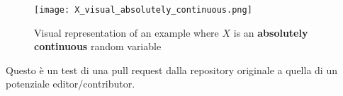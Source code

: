             \begin{figure}[h]
                \centering
                \texttt{[image: X\_visual\_absolutely\_continuous.png]}
                \caption{Visual representation of an example where \(X\) is an \textbf{absolutely continuous} random variable}
                \label{fig:X_visual_absolutely_continuous}
            \end{figure}

        Questo è un test di una pull request dalla repository originale a quella di un potenziale editor/contributor.
